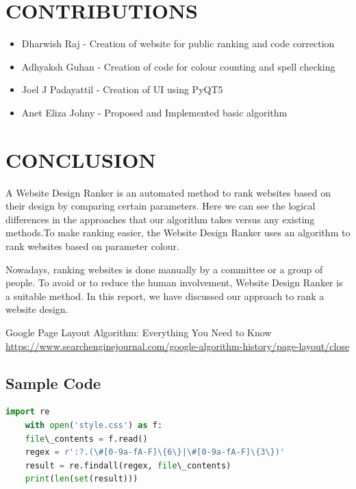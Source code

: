 \documentclass{fisatproject}
\begin{document}
\chapter{CONTRIBUTIONS}
\begin{itemize}
	\item Dharwish Raj - Creation of website for public ranking and code correction
	\item Adhyaksh Guhan - Creation of code for colour counting and spell checking
	\item Joel J Padayattil - Creation of UI using PyQT5
	\item Anet Eliza Johny - Proposed and Implemented basic algorithm 
\end{itemize}
\chapter{CONCLUSION}

A Website Design Ranker is an automated method to rank websites based on their design by comparing certain parameters. Here we can see the logical differences in the approaches that our algorithm takes versus any existing methods.To make ranking easier, the Website Design Ranker uses an algorithm to rank websites based on parameter colour.

Nowadays, ranking websites is done manually by a committee or a group of people. To avoid or to reduce the human involvement, Website Design Ranker is a suitable method. In this report, we have discussed our approach to rank a website design.



\begin{thebibliography}{1}
 Google Page Layout Algorithm: Everything You Need to
Know
 \url{https://www.searchenginejournal.com/google-algorithm-history/page-layout/close}

\end{thebibliography}

\begin{appendices}
\chapter{Sample Code}
\begin{lstlisting}[language=python]
	import re
	with open('style.css') as f:
	file\_contents = f.read()
	regex = r':?.(\#[0-9a-fA-F]\{6\}|\#[0-9a-fA-F]\{3\})'
	result = re.findall(regex, file\_contents)
	print(len(set(result)))

\end{lstlisting}
\end{appendices}
\end{document}
